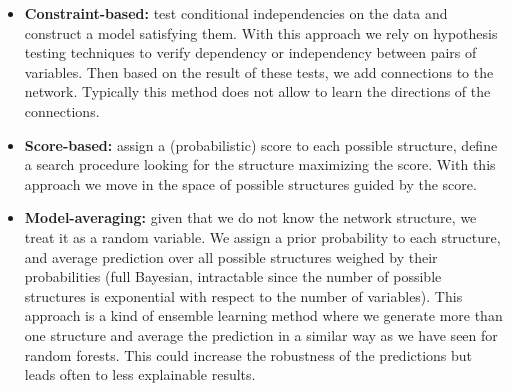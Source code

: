 \begin{itemize}
	\item \textbf{Constraint-based:} test conditional independencies on the data
		and construct a model satisfying them. With this approach we rely on hypothesis
		testing techniques to verify dependency or independency between pairs of variables.
		Then based on the result of these tests, we add connections to the network.
		Typically this method does not allow to learn the directions of the
		connections.

	\item \textbf{Score-based:} assign a (probabilistic) score to each possible
		structure, define a search procedure looking for the structure maximizing the
		score. With this approach we move in the space of possible structures guided
		by the score.

	\item \textbf{Model-averaging:} given that we do not know the network
		structure, we treat it as a random variable. We assign a prior probability
		to each structure, and average prediction over all possible structures weighed
		by their probabilities (full Bayesian, intractable since the number of possible
		structures is exponential with respect to the number of variables). This approach
		is a kind of ensemble learning method where we generate more than one structure
		and average the prediction in a similar way as we have seen for random forests.
		This could increase the robustness of the predictions but leads often to
		less explainable results.
\end{itemize}